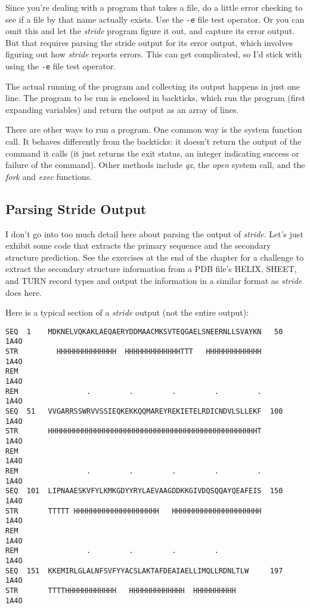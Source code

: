 Since you're dealing with a program that takes a file, do a little error checking to see if a file by that name actually exists. Use the \verb|-e| file test operator. Or you can omit this and let the \textit{stride} program figure it out, and capture its error output. But that requires parsing the stride output for its error output, which involves figuring out how \textit{stride} reports errors. This can get complicated, so I'd stick with using the \verb|-e| file test operator.

The actual running of the program and collecting its output happens in just one line. The program to be run is enclosed in backticks, which run the program (first expanding variables) and return the output as an array of lines.

There are other ways to run a program. One common way is the system function call. It behaves differently from the backticks: it doesn't return the output of the command it calls (it just returns the exit status, an integer indicating success or failure of the command). Other methods include \textit{qx}, the \textit{open} system call, and the \textit{fork} and \textit{exec} functions. 

\subsection{Parsing Stride Output}
I don't go into too much detail here about parsing the output of \textit{stride}. Let's just exhibit some code that extracts the primary sequence and the secondary structure prediction. See the exercises at the end of the chapter for a challenge to extract the secondary structure information from a PDB file's HELIX, SHEET, and TURN record types and output the information in a similar format as \textit{stride} does here.
  
Here is a typical section of a \textit{stride} output (not the entire output):

\begin{lstlisting}
SEQ  1    MDKNELVQKAKLAEQAERYDDMAACMKSVTEQGAELSNEERNLLSVAYKN   50          1A4O
STR         HHHHHHHHHHHHHH  HHHHHHHHHHHHHTTT   HHHHHHHHHHHHH               1A4O
REM                                                                        1A4O
REM                .         .         .         .         .               1A4O
SEQ  51   VVGARRSSWRVVSSIEQKEKKQQMAREYREKIETELRDICNDVLSLLEKF  100          1A4O
STR       HHHHHHHHHHHHHHHHHHHHHHHHHHHHHHHHHHHHHHHHHHHHHHHHHT               1A4O
REM                                                                        1A4O
REM                .         .         .         .         .               1A4O
SEQ  101  LIPNAAESKVFYLKMKGDYYRYLAEVAAGDDKKGIVDQSQQAYQEAFEIS  150          1A4O
STR       TTTTT HHHHHHHHHHHHHHHHHHHH   HHHHHHHHHHHHHHHHHHHHH               1A4O
REM                                                                        1A4O
REM                .         .         .         .                         1A4O
SEQ  151  KKEMIRLGLALNFSVFYYACSLAKTAFDEAIAELLIMQLLRDNLTLW     197          1A4O
STR       TTTTHHHHHHHHHHHH   HHHHHHHHHHHHH  HHHHHHHHHH                     1A4O
\end{lstlisting}

